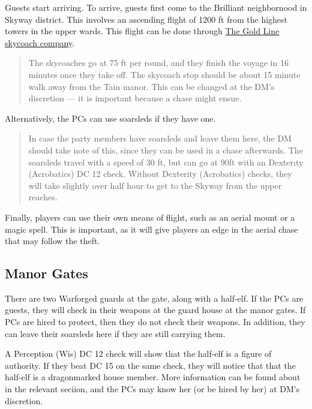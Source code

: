 \documentclass[twocolumn]{dndbook}
\newenvironment{emphasisParagraph}{
	\begin{quote}
	\begin{mdframed}[
		topline=false,
		bottomline=false,
		rightline=false,
		skipabove=\topsep,
		skipbelow=\topsep,
		linecolor=xkcdBottleGreen,
		linewidth=3pt,
	]
	\em
}{
	\end{mdframed}
	\end{quote}
}
\begin{document}
Guests start arriving.
To arrive, guests first come to the Brilliant neighbornood in Skyway district.
This involves an ascending flight of 1200 ft from the highest towers in the upper wards.
This flight can be done through \href{https://keith-baker.com/ifaq-skycoaches/}{The Gold Line skycoach company}.
\begin{emphasisParagraph}
	The skycoaches go at 75 ft per round, and they finish the voyage in 16 minutes once they take off.
	The skycoach stop should be about 15 minute walk away from the Tain manor.
	This can be changed at the DM's discretion --- it is important because a chase might ensue.
\end{emphasisParagraph}
Alternatively, the PCs can use soarsleds if they have one.
\begin{emphasisParagraph}
	In case the party members have soarsleds and leave them here,
	the DM should take note of this, since they can be used in a chase afterwards.
	The soarsleds travel with a speed of 30 ft, but can go at 90ft with an Dexterıty (Acrobatics) DC 12 check.
	Without Dexterity (Acrobatics) checks,
	they will take slightly over half hour to get to the Skyway from the upper reaches.
\end{emphasisParagraph}

Finally, players can use their own means of flight, such as an aerial mount or a magic spell.
This is important, as it will give players an edge in the aerial chase that may follow the theft.

\subsection{Manor Gates}


There are two Warforged guards at the gate, along with a half-elf.
If the PCs are guests, they will check in their weapons at the guard house at the manor gates.
If PCs are hired to protect, then they do not check their weapons.
In addition, they can leave their soarsleds here if they are still carrying them.\par

A Perception (Wis) DC 12 check will show that the half-elf is a figure of authority.
If they beat DC 15 on the same check, they will notice that that the half-elf is a dragonmarked house member.
More information can be found about  in the relevant seciion,
and the PCs may know her (or be hired by her) at DM's discretion.\par
\end{document}
